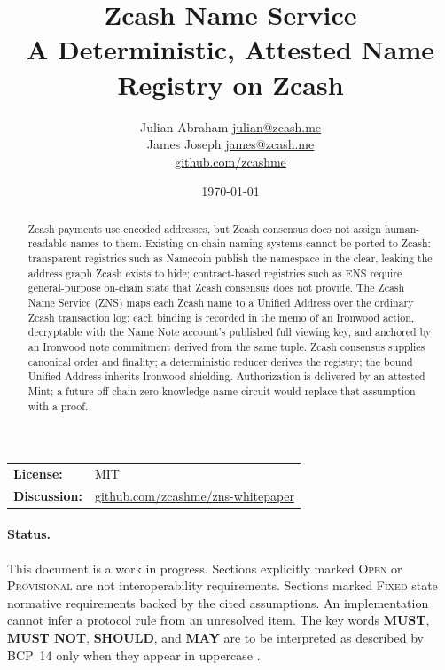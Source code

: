 \documentclass[11pt]{article}
\title{\textbf{Zcash Name Service}\\
\large A Deterministic, Attested Name Registry on Zcash}
\author{Julian Abraham \quad \href{mailto:julian@zcash.me}{julian@zcash.me} \\
James Joseph \quad \href{mailto:james@zcash.me}{james@zcash.me} \\
\href{https://github.com/zcashme}{github.com/zcashme}}
\date{\today}
\newcommand{\zns}{\textsc{ZNS}}
\newcommand{\openstatus}{\textsc{Open}}
\newcommand{\provisional}{\textsc{Provisional}}
\newcommand{\fixedstatus}{\textsc{Fixed}}
\begin{document}
\maketitle

\begin{center}
\begin{tabular}{@{}ll@{}}
\textbf{License:} & MIT \\[0.2em]
\textbf{Discussion:} & \href{https://github.com/zcashme/zns-whitepaper}{github.com/zcashme/zns-whitepaper}
\end{tabular}
\end{center}

\begin{abstract}
Zcash payments use encoded addresses, but Zcash consensus does not assign human-readable names to them.
Existing on-chain naming systems cannot be ported to Zcash: transparent registries such as Namecoin publish the namespace in the clear, leaking the address graph Zcash exists to hide; contract-based registries such as ENS require general-purpose on-chain state that Zcash consensus does not provide.
The Zcash Name Service (\zns) maps each Zcash name to a Unified Address over the ordinary Zcash transaction log: each binding is recorded in the memo of an Ironwood action, decryptable with the Name Note account's published full viewing key, and anchored by an Ironwood note commitment derived from the same tuple.
Zcash consensus supplies canonical order and finality; a deterministic reducer derives the registry; the bound Unified Address inherits Ironwood shielding.
Authorization is delivered by an attested Mint; a future off-chain zero-knowledge name circuit would replace that assumption with a proof.
\end{abstract}

\paragraph{Status.}
This document is a work in progress.
Sections explicitly marked \openstatus{} or \provisional{} are not interoperability requirements.
Sections marked \fixedstatus{} state normative requirements backed by the cited assumptions.
An implementation cannot infer a protocol rule from an unresolved item.
The key words \textbf{MUST}, \textbf{MUST NOT}, \textbf{SHOULD}, and \textbf{MAY} are to be interpreted as described by BCP~14 only when they appear in uppercase \cite{bcp14}.









\end{document}
